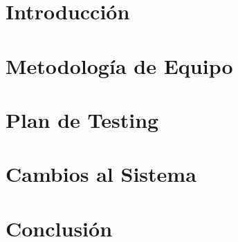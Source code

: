 \documentclass[letterpaper,11pt]{article} %
\begin{document}









\section{Introducción}


\newpage
\section{Metodología de Equipo}


\newpage
\section{Plan de Testing}


\newpage
\section{Cambios al Sistema}


\newpage
\section{Conclusión}


\end{document}
